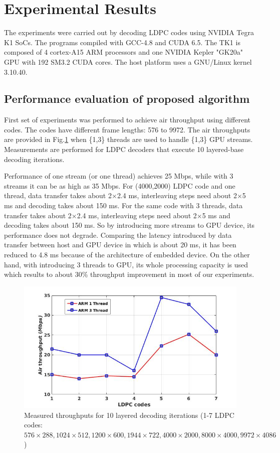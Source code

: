 \documentclass[conference]{IEEEtran}
\begin{document}
\section{Experimental Results} \label{sec4}

The experiments were carried out by decoding LDPC codes using NVIDIA Tegra K1 SoCs. The programs compiled with GCC-4.8 and CUDA 6.5. The TK1 is composed of 4 cortex-A15 ARM processors and one NVIDIA Kepler "GK20a" GPU with 192 SM3.2 CUDA cores. The host platform uses a GNU/Linux kernel 3.10.40.

\subsection{Performance evaluation of proposed algorithm} 
First set of experiments was performed to achieve air throughput using different codes. The codes have different frame lengths: 576 to 9972. The air throughputs are provided in Fig.\ref{fig::air} when \{1,3\} threads are used to handle \{1,3\} GPU streams. Measurements are performed for LDPC decoders that execute 10 layered-base decoding iterations.

Performance of one stream (or one thread) achieves 25 Mbps, while with 3 streams it can be as high as 35 Mbps. For (4000,2000) LDPC code and one thread, data transfer takes about 2$\times$2.4 ms, interleaving steps need about 2$\times$5 ms and decoding takes about 150 ms. For the same code with 3 threads, data transfer takes about 2$\times$2.4 ms, interleaving steps need about 2$\times$5 ms and decoding takes about 150 ms. So by introducing more streams to GPU device, its performance does not degrade. Comparing the latency introduced by data transfer between host and GPU device in \cite{art_gpu_0} which is about 20 ms, it has been reduced to 4.8 ms because of the architecture of embedded device. On the other hand, with introducing 3 threads to GPU, its whole processing capacity is used which results to about 30\% throughput improvement in most of our experiments.

\begin{figure}[h]
\begin{centering}
\includegraphics[scale=0.35]{air.jpg}
\caption[width=.5\textwidth]{Measured throughputs for 10 layered decoding iterations (1-7 LDPC codes: $576 \times 288, 1024 \times 512, 1200 \times 600, 1944 \times 722, 4000 \times 2000, 8000 \times 4000, 9972 \times 4086$)}\label{fig::air}
\end{centering}
\end{figure}
\end{document}

